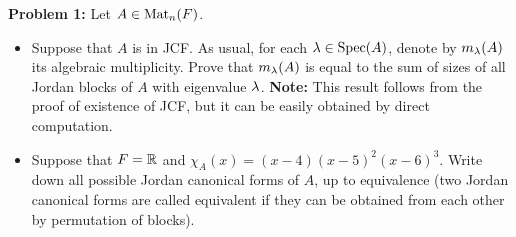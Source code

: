 \documentclass[11pt]{amsart}
\begin{document}
\noindent 
\skv
{\bf Problem 1:} Let $A\in {\rm Mat}_{n}(F)$.
\begin{itemize}
\item[(a)] Suppose that $A$ is in JCF. As usual, for each ${\lambda}\in {\rm Spec}(A)$, denote by $m_{{\lambda}}(A)$ its algebraic multiplicity.
Prove that $m_{{\lambda}}(A)$ is equal to the sum of sizes of all Jordan blocks
of $A$ with eigenvalue ${\lambda}$. {\bf Note:} This result follows from
the proof of existence of JCF, but it can be easily obtained by direct
computation.
\item[(b)] Suppose that $F={\mathbb R}$ and $\chi_A(x)=(x-4)(x-5)^2(x-6)^3$.
Write down all possible Jordan canonical forms of $A$, up to equivalence
(two Jordan canonical forms are called equivalent if they can be obtained
from each other by permutation of blocks).
\end{itemize}
\skv
\end{document}
